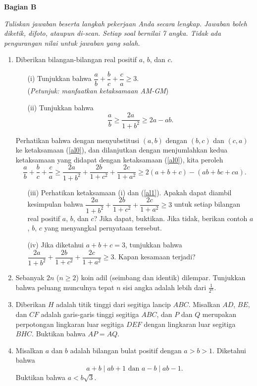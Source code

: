 \documentclass[a4paper, 12pt]{article}
\begin{document}
\newpage

\begin{center}
\textbf{Bagian B}
\end{center}
{\it Tuliskan jawaban beserta langkah pekerjaan Anda secara lengkap. Jawaban boleh diketik, difoto, ataupun di-scan. Setiap soal bernilai 7 angka. Tidak ada pengurangan nilai untuk jawaban yang salah.}
\begin{enumerate}
\item Diberikan bilangan-bilangan real positif $a$, $b$, dan $c$.
\begin{enumerate}
	\item[(i)] Tunjukkan bahwa $\dfrac{a}{b}+\dfrac{b}{c}+\dfrac{c}{a}\geq 3$. \\
	(\textit{Petunjuk: manfaatkan ketaksamaan AM-GM})
	\item[(ii)] Tunjukkan bahwa
	\begin{equation}\label{al0}
	\frac{a}{b}\geq \frac{2a}{1+b^2}\geq 2a-ab.\tag{*}
	\end{equation}
\end{enumerate}
	Perhatikan bahwa dengan menyubstitusi $(a,b)$ dengan $(b,c)$ dan $(c,a)$ ke  ketaksamaan (\ref{al0}), dan dilanjutkan dengan menjumlahkan kedua ketaksamaan yang didapat dengan ketaksamaan (\ref{al0}), kita peroleh
	\begin{equation*}\label{al1}
	\frac{a}{b}+\frac{b}{c}+\frac{c}{a} \geq \frac{2a}{1+b^2}+\frac{2b}{1+c^2}+\frac{2c}{1+a^2}\geq 2(a+b+c)-(ab+bc+ca).\tag{**}
	\end{equation*}
	\begin{enumerate}
	\item[(iii)] Perhatikan ketaksamaan (i) dan (\ref{al1}). Apakah dapat diambil kesimpulan bahwa $\dfrac{2a}{1+b^2}+\dfrac{2b}{1+c^2}+\dfrac{2c}{1+a^2}\geq 3$ untuk setiap bilangan real positif $a$, $b$, dan $c$? Jika dapat, buktikan. Jika tidak, berikan contoh $a$, $b$, $c$ yang menyangkal pernyataan tersebut.
	\item[(iv)] Jika diketahui $a+b+c=3$, tunjukkan bahwa $\dfrac{2a}{1+b^2}+\dfrac{2b}{1+c^2}+\dfrac{2c}{1+a^2}\geq 3$. Kapan kesamaan terjadi?
\end{enumerate}

\item Sebanyak $2n$ ($n \geq 2$) koin adil (seimbang dan identik) dilempar. Tunjukkan bahwa peluang munculnya tepat $n$ sisi angka adalah lebih dari $\frac{1}{2^n}$.

\item Diberikan $H$ adalah titik tinggi dari segitiga lancip $ABC$. Misalkan $AD$, $BE$, dan $CF$ adalah garis-garis tinggi segitiga $ABC$, dan $P$ dan $Q$ merupakan perpotongan lingkaran luar segitiga $DEF$ dengan lingkaran luar segitiga $BHC$. Buktikan bahwa $AP = AQ$.

\item Misalkan $a$ dan $b$ adalah bilangan bulat positif dengan $a > b > 1$. Diketahui bahwa \[ a+b\mid ab+1 \text{ dan } a-b\mid ab-1. \] Buktikan bahwa $a < b\sqrt{3}$.

\end{enumerate}
\end{document}
